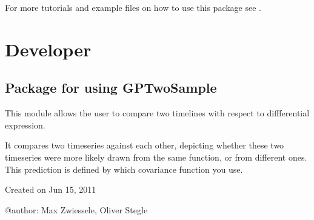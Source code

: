 \documentclass[letterpaper,10pt,english]{sphinxmanual}
\begin{document}
For more tutorials and example files on how to use this package see
.


\chapter{Developer}
\label{index:developer}\label{base:module-gptwosample}

\section{Package for using GPTwoSample}
\label{base:package-for-using-gptwosample}\label{base::doc}
This module allows the user to compare two timelines with respect to diffferential expression.

It compares two timeseries against each other, depicting whether these two
timeseries were more likely drawn from the same function, or from
different ones. This prediction is defined by which covariance function  you use.

Created on Jun 15, 2011

@author: Max Zwiessele, Oliver Stegle
\end{document}
